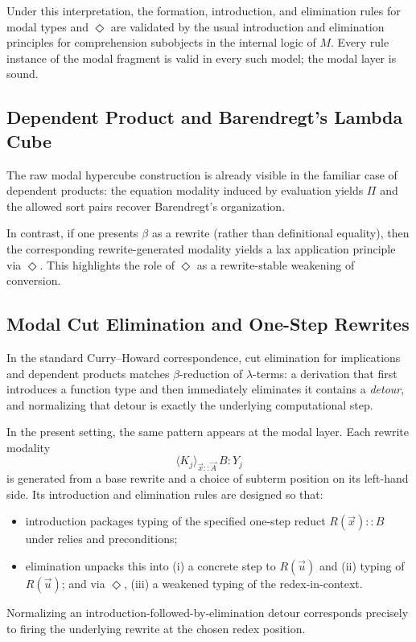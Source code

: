 \documentclass[11pt]{article}
\theoremstyle{definition}
\theoremstyle{plain}
\theoremstyle{remark}
\theoremstyle{plain}
\newcommand{\angles}[3]{\langle #1 \rangle_{#2}\,#3}
\begin{document}
Under this interpretation, the formation, introduction, and elimination rules for modal types and $\Diamond$ are validated by the usual introduction and elimination principles for comprehension subobjects in the internal logic of $M$.  Every rule instance of the modal fragment is valid in every such model; the modal layer is sound.

\subsection{Dependent Product and Barendregt's Lambda Cube}

The raw modal hypercube construction is already visible in the familiar case of dependent products: the equation modality induced by evaluation yields $\Pi$ and the allowed sort pairs recover Barendregt's organization.

In contrast, if one presents $\beta$ as a rewrite (rather than definitional equality), then the corresponding rewrite-generated modality yields a lax application principle via $\Diamond$. This highlights the role of $\Diamond$ as a rewrite-stable weakening of conversion.

\subsection{Modal Cut Elimination and One-Step Rewrites}
\label{subsec:modal-CH}

In the standard Curry--Howard correspondence, cut elimination for implications and dependent products matches $\beta$-reduction of $\lambda$-terms: a derivation that first introduces a function type and then immediately eliminates it contains a \emph{detour}, and normalizing that detour is exactly the underlying computational step.

In the present setting, the same pattern appears at the modal layer.  Each rewrite modality
\[
  \angles{K_j}{\vec{x}::\vec{A}}{B} : Y_j
\]
is generated from a base rewrite and a choice of subterm position on its left-hand side.  Its introduction and elimination rules are designed so that:
\begin{itemize}
  \item introduction packages typing of the specified one-step reduct $R(\vec x)::B$ under relies and preconditions;
  \item elimination unpacks this into (i) a concrete step to $R(\vec u)$ and (ii) typing of $R(\vec u)$; and via $\Diamond$, (iii) a weakened typing of the redex-in-context.
\end{itemize}
Normalizing an introduction-followed-by-elimination detour corresponds precisely to firing the underlying rewrite at the chosen redex position.
\end{document}
